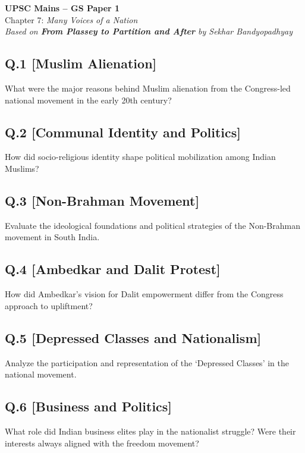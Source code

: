 \begin{center}
    \Large\textbf{UPSC Mains – GS Paper 1}\\
    \normalsize Chapter 7: \textit{Many Voices of a Nation}\\
    \vspace{0.5em}
    \textit{Based on \textbf{From Plassey to Partition and After} by Sekhar Bandyopadhyay}
\end{center}

\vspace{1em}

\subsection*{Q.1 [Muslim Alienation]}
What were the major reasons behind Muslim alienation from the Congress-led national movement in the early 20th century?

\subsection*{Q.2 [Communal Identity and Politics]}
How did socio-religious identity shape political mobilization among Indian Muslims?

\subsection*{Q.3 [Non-Brahman Movement]}
Evaluate the ideological foundations and political strategies of the Non-Brahman movement in South India.

\subsection*{Q.4 [Ambedkar and Dalit Protest]}
How did Ambedkar's vision for Dalit empowerment differ from the Congress approach to upliftment?

\subsection*{Q.5 [Depressed Classes and Nationalism]}
Analyze the participation and representation of the ‘Depressed Classes’ in the national movement.

\subsection*{Q.6 [Business and Politics]}
What role did Indian business elites play in the nationalist struggle? Were their interests always aligned with the freedom movement?

